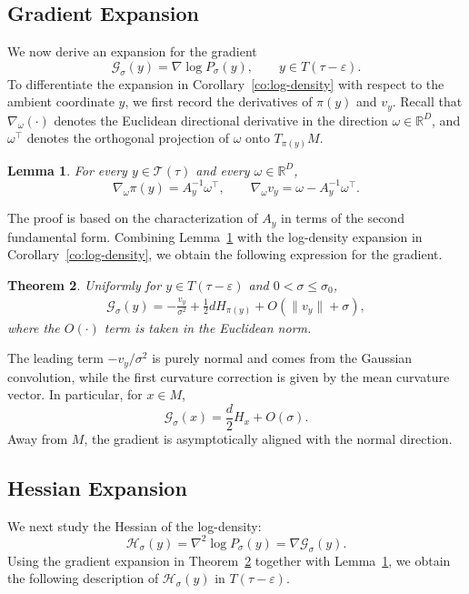\documentclass[11pt]{article}
\theoremstyle{plain}
\newtheorem{theorem}{Theorem}[section]
\newtheorem{lemma}[theorem]{Lemma}
\theoremstyle{definition}
\begin{document}
\subsection{Gradient Expansion}
We now derive an expansion for the gradient
\[
\mathcal G_\sigma(y) = \nabla \log P_\sigma(y), \qquad y \in T(\tau-\varepsilon).
\]
To differentiate the expansion in Corollary~\ref{co:log-density} with respect to the ambient coordinate $y$, we first record the derivatives of $\pi(y)$ and $v_y$. Recall that $\nabla_\omega(\cdot)$ denotes the Euclidean directional derivative in the direction $\omega \in \mathbb{R}^D$, and $\omega^\top$ denotes the orthogonal projection of $\omega$ onto $T_{\pi(y)}M$.
\begin{lemma}\label{lem:derivative-of-v-pi}
    For every $y\in \mathcal T(\tau)$ and every $\omega\in \mathbb{R}^D$,
    \[
    \nabla_\omega\pi(y) = A_y^{-1} \omega^\top, \qquad \nabla_\omega v_y =\omega - A_y^{-1}\omega^\top.
    \]
\end{lemma}
The proof is based on the characterization of $A_y$ in terms of the second fundamental form. Combining Lemma~\ref{lem:derivative-of-v-pi} with the log-density expansion in Corollary~\ref{co:log-density}, we obtain the following expression for the gradient.
\begin{theorem}\label{th:gradient-noisy}
Uniformly for $y\in T(\tau-\varepsilon)$ and $0<\sigma\le\sigma_0$,
    \begin{align}\label{eq:gradient}
        \mathcal G_\sigma(y) = -\frac{v_y}{\sigma^2}+\frac{1}{2}dH_{\pi(y)}+O(\|v_y\|+\sigma),
    \end{align}
    where the $O(\cdot)$ term is taken in the Euclidean norm.
\end{theorem}
The leading term $-v_y/\sigma^2$ is purely normal and comes from the Gaussian convolution, while the first curvature correction is given by the mean curvature vector. In particular, for $x\in M$,
\[
\mathcal G_\sigma(x)=\frac d2 H_x+O(\sigma).
\]
Away from $M$, the gradient is asymptotically aligned with the normal direction.

\subsection{Hessian Expansion}
We next study the Hessian of the log-density:
\[
\mathcal{H}_\sigma(y) = \nabla^2\log P _\sigma(y) = \nabla \mathcal G_\sigma(y).
\]
Using the gradient expansion in Theorem~\ref{th:gradient-noisy} together with Lemma~\ref{lem:derivative-of-v-pi}, we obtain the following description of $\mathcal{H}_\sigma(y)$ in $T(\tau-\varepsilon)$.
\end{document}

